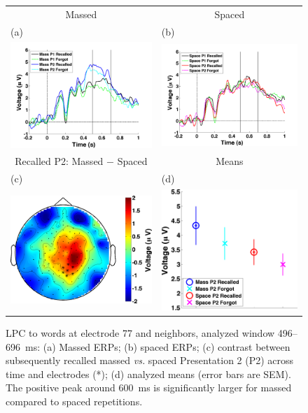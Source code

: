 \begin{figure}[hp]
  \centering
  \begin{tabular}{cc}
  Massed & Spaced \\
  \multicolumn{1}{l}{(a)} & \multicolumn{1}{l}{(b)} \\
  \includegraphics[width=.35\textwidth]{./figs/exp1/tla_single_ga_word_RgH_rc_mass_p1_word_RgH_fo_mass_p1_word_RgH_rc_mass_p2_word_RgH_fo_mass_p2_E62_E72_E76_E77_E78_E84_E85_-200_1000_legend_xylabel} &
  \includegraphics[width=.35\textwidth]{./figs/exp1/tla_single_ga_word_RgH_rc_spac_p1_word_RgH_fo_spac_p1_word_RgH_rc_spac_p2_word_RgH_fo_spac_p2_E62_E72_E76_E77_E78_E84_E85_-200_1000_legend_xylabel} \\
  Recalled P2: Massed $-$ Spaced & Means \\
  \multicolumn{1}{l}{(c)} & \multicolumn{1}{l}{(d)} \\
  \includegraphics[width=.29\textwidth]{./figs/exp1/tla_topocont_ga_word_RgH_rc_mass_p2vsword_RgH_rc_spac_p2_E62_E72_E76_E77_E78_E84_E85_496_696_-2p0_2p0_cb} &
  \includegraphics[width=.30\textwidth]{./figs/exp1/tla_line_ga_word_RgH_rc_mass_p2_word_RgH_fo_mass_p2_word_RgH_rc_spac_p2_word_RgH_fo_spac_p2_E62_E72_E76_E77_E78_E84_E85_496_696_ylabel} \\
  \end{tabular}
  \caption{LPC to words at electrode 77 and neighbors, analyzed window 496--696~ms: (a) Massed ERPs; (b) spaced ERPs; (c) contrast between subsequently recalled massed \textit{vs.} spaced Presentation 2 (P2) across time and electrodes (*); (d) analyzed means (error bars are SEM).  The positive peak around 600~ms is significantly larger for massed compared to spaced repetitions.}
  \label{fig:LPC}
\end{figure}

